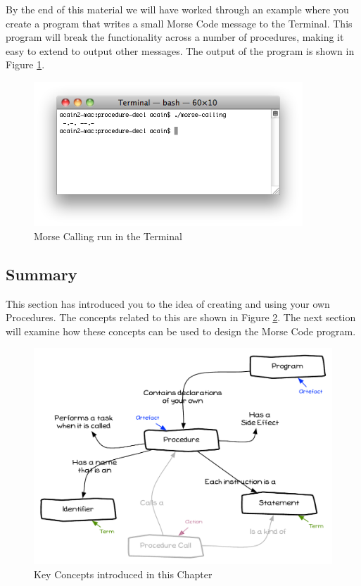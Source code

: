 By the end of this material we will have worked through an example where you create a program that writes a small Morse Code message to the Terminal. This program will break the functionality across a number of procedures, making it easy to extend to output other messages. The output of the program is shown in Figure \ref{fig:procedure-decl-morse_calling}.

\begin{figure}[h]
   \centering
   \includegraphics[width=0.9\textwidth]{./topics/procedure-decl/images/MorseCalling} 
   \caption{Morse Calling run in the Terminal}
   \label{fig:procedure-decl-morse_calling}
\end{figure}





\clearpage
\subsection{Summary} %
\label{sub:procedure-decl_summary}

This section has introduced you to the idea of creating and using your own Procedures. The concepts related to this are shown in Figure \ref{fig:procedure-decl-summary}. The next section will examine how these concepts can be used to design the Morse Code program.

\begin{figure}[h]
   \centering
   \includegraphics[width=\textwidth]{./topics/procedure-decl/diagrams/Summary} 
   \caption[Chapter Concepts]{Key Concepts introduced in this Chapter}
   \label{fig:procedure-decl-summary}
\end{figure}

